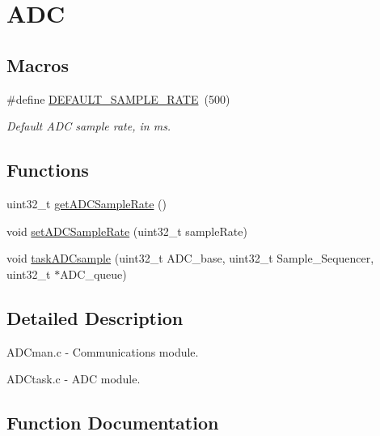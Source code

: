 \hypertarget{group___a_d_c}{}\section{A\+DC}
\label{group___a_d_c}
\subsection*{Macros}
\begin{DoxyCompactItemize}
\item 
\#define \hyperlink{group___a_d_c_gabe9b1c28165a7071e354bd9d7823ca1a}{D\+E\+F\+A\+U\+L\+T\+\_\+\+S\+A\+M\+P\+L\+E\+\_\+\+R\+A\+TE}~(500)\hypertarget{group___a_d_c_gabe9b1c28165a7071e354bd9d7823ca1a}{}\label{group___a_d_c_gabe9b1c28165a7071e354bd9d7823ca1a}

\begin{DoxyCompactList}\small\item\em Default A\+DC sample rate, in ms. \end{DoxyCompactList}\end{DoxyCompactItemize}
\subsection*{Functions}
\begin{DoxyCompactItemize}
\item 
uint32\+\_\+t \hyperlink{group___a_d_c_ga6de35339071e6a8b3739dd8fda53af5a}{get\+A\+D\+C\+Sample\+Rate} ()
\item 
void \hyperlink{group___a_d_c_ga2a0f9e472b72054c6ae59882d336f014}{set\+A\+D\+C\+Sample\+Rate} (uint32\+\_\+t sample\+Rate)
\item 
void \hyperlink{group___a_d_c_ga1365a853a2f6c0826277c578a30cf503}{task\+A\+D\+Csample} (uint32\+\_\+t A\+D\+C\+\_\+base, uint32\+\_\+t Sample\+\_\+\+Sequencer, uint32\+\_\+t $\ast$A\+D\+C\+\_\+queue)
\end{DoxyCompactItemize}


\subsection{Detailed Description}
A\+D\+Cman.\+c -\/ Communications module.

A\+D\+Ctask.\+c -\/ A\+DC module. 

\subsection{Function Documentation}
